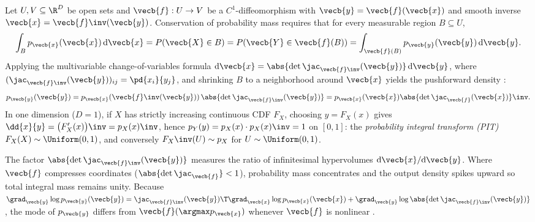 \documentclass[../../../../master.tex]{subfiles}
\begin{document}
\begin{coremath}
Let $U, V \subseteq \R^D$ be open sets and $\vecb{f} : U \to V$ be a $C^1$-diffeomorphism with $\vecb{y} = \vecb{f}(\vecb{x})$ and smooth inverse $\vecb{x} = \vecb{f}\inv(\vecb{y})$. Conservation of probability mass requires that for every measurable region $B \subseteq U$,
\begin{equation}\label{eq:probdist:cov_integral}
  \int_{B} p_{\vecb{x}}(\vecb{x})\,\mathrm{d}\vecb{x}
  = P(\vecb{X} \in B)
  = P(\vecb{Y} \in \vecb{f}(B))
  = \int_{\vecb{f}(B)} p_{\vecb{y}}(\vecb{y})\,\mathrm{d}\vecb{y}.
\end{equation}
Applying the multivariable change-of-variables formula $\mathrm{d}\vecb{x} = \abs{\det \jac_{\vecb{f}\inv}(\vecb{y})}\,\mathrm{d}\vecb{y}$, where $(\jac_{\vecb{f}\inv}(\vecb{y}))_{ij} = \pd{x_i}{y_j}$, and shrinking $B$ to a neighborhood around $\vecb{x}$ yields the pushforward density   :
\begin{equation}\label{eq:probdist:cov_density}
  p_{\vecb{y}}(\vecb{y})
  = p_{\vecb{x}}\!\left(\vecb{f}\inv(\vecb{y})\right) \abs{\det \jac_{\vecb{f}\inv}(\vecb{y})}
  = p_{\vecb{x}}(\vecb{x}) \abs{\det \jac_{\vecb{f}}(\vecb{x})}\inv.
\end{equation}
In one dimension ($D=1$), if $X$ has strictly increasing continuous CDF $F_X$, choosing $y = F_X(x)$ gives $\dd{x}{y} = \bigl(F_X'(x)\bigr)\inv = p_X(x)\inv$, hence $p_Y(y) = p_X(x)\cdot p_X(x)\inv = 1$ on $[0,1]$: the \emph{probability integral transform (PIT)} $F_X(X) \sim \Uniform(0,1)$, and conversely $F_X\inv(U) \sim p_X$ for $U \sim \Uniform(0,1)$.
\end{coremath}

\begin{intuition}
The factor $\abs{\det \jac_{\vecb{f}\inv}(\vecb{y})}$ measures the ratio of infinitesimal hypervolumes $\mathrm{d}\vecb{x} / \mathrm{d}\vecb{y}$. Where $\vecb{f}$ compresses coordinates ($\abs{\det \jac_{\vecb{f}}} < 1$), probability mass concentrates and the output density spikes upward so total integral mass remains unity. Because $\grad_{\vecb{y}} \log p_{\vecb{y}}(\vecb{y}) = \jac_{\vecb{f}\inv}(\vecb{y})\T \grad_{\vecb{x}}\log p_{\vecb{x}}(\vecb{x}) + \grad_{\vecb{y}}\log\abs{\det \jac_{\vecb{f}\inv}(\vecb{y})}$, the mode of $p_{\vecb{y}}$ differs from $\vecb{f}(\argmax p_{\vecb{x}})$ whenever $\vecb{f}$ is nonlinear .
\end{intuition}
\end{document}
